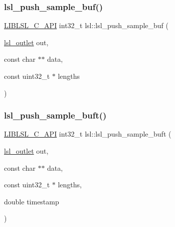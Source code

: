 \subsubsection{\texorpdfstring{lsl\+\_\+push\+\_\+sample\+\_\+buf()}{lsl\_push\_sample\_buf()}}
{\footnotesize\ttfamily \hyperlink{lsl__cpp_8h_aafd0ef1813e8be84a1420c4f1df64615}{L\+I\+B\+L\+S\+L\+\_\+\+C\+\_\+\+A\+PI} int32\+\_\+t lsl\+::lsl\+\_\+push\+\_\+sample\+\_\+buf (\begin{DoxyParamCaption}\item[{\hyperlink{namespacelsl_abcf512b0f66dacf86c10b165995fd50b}{lsl\+\_\+outlet}}]{out,  }\item[{const char $\ast$$\ast$}]{data,  }\item[{const uint32\+\_\+t $\ast$}]{lengths }\end{DoxyParamCaption})}

\mbox{\label{namespacelsl_ace903fc8ac868a1afedf98090f5c5b4c}} 
\subsubsection{\texorpdfstring{lsl\+\_\+push\+\_\+sample\+\_\+buft()}{lsl\_push\_sample\_buft()}}
{\footnotesize\ttfamily \hyperlink{lsl__cpp_8h_aafd0ef1813e8be84a1420c4f1df64615}{L\+I\+B\+L\+S\+L\+\_\+\+C\+\_\+\+A\+PI} int32\+\_\+t lsl\+::lsl\+\_\+push\+\_\+sample\+\_\+buft (\begin{DoxyParamCaption}\item[{\hyperlink{namespacelsl_abcf512b0f66dacf86c10b165995fd50b}{lsl\+\_\+outlet}}]{out,  }\item[{const char $\ast$$\ast$}]{data,  }\item[{const uint32\+\_\+t $\ast$}]{lengths,  }\item[{double}]{timestamp }\end{DoxyParamCaption})}

\mbox{\label{namespacelsl_a62d7f7be3db90336d61e89633c4b1a5e}} 
